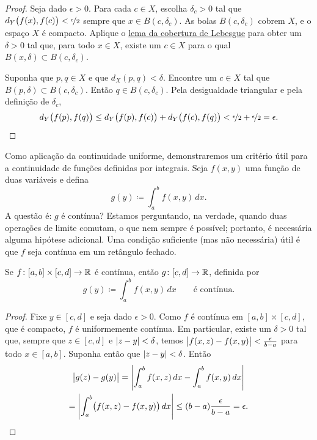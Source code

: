 \begin{proof}
Seja dado $\epsilon > 0$. Para cada $c \in X$, escolha $\delta_c > 0$ tal que
$d_Y\bigl(f(x),f(c)\bigr) < \nicefrac{\epsilon}{2}$
sempre que
$x \in B(c,\delta_c)$.
As bolas
$B(c,\delta_c)$ cobrem $X$, e o espaço $X$ é compacto.
Aplique o \hyperref[ms:lebesgue]{lema da cobertura de Lebesgue} para obter um
$\delta > 0$ tal que, para todo $x \in X$, existe um $c \in X$
para o qual $B(x,\delta) \subset B(c,\delta_c)$.

Suponha que $p, q \in X$ e que $d_X(p,q) < \delta$.
Encontre um $c \in X$ tal que $B(p,\delta) \subset B(c,\delta_c)$.
Então $q \in B(c,\delta_c)$. Pela desigualdade triangular
e pela definição de $\delta_c$,
\begin{equation*}
d_Y\bigl(f(p),f(q)\bigr)
\leq
d_Y\bigl(f(p),f(c)\bigr)
+
d_Y\bigl(f(c),f(q)\bigr)
<
\nicefrac{\epsilon}{2}+
\nicefrac{\epsilon}{2} = \epsilon .  \qedhere
\end{equation*}
\end{proof}

Como aplicação da continuidade uniforme,
demonstraremos um critério útil para a
continuidade de funções definidas por integrais.
Seja $f(x,y)$ uma função de duas variáveis e defina
\begin{equation*}
g(y) \coloneqq \int_a^b f(x,y) \,dx .
\end{equation*}
A questão é: $g$ é contínua?
Estamos perguntando, na verdade, quando duas operações de limite comutam,
o que nem sempre é possível; portanto, é necessária alguma hipótese
adicional. Uma condição suficiente (mas não
necessária) útil é que $f$ seja contínua em um retângulo fechado.

\begin{prop} \label{prop:integralcontcont}
Se $f \colon [a,b] \times [c,d] \to {\mathbb{R}}$ é contínua,
então $g \colon [c,d] \to {\mathbb{R}}$, definida por
\begin{equation*}
g(y) \coloneqq \int_a^b f(x,y) \,dx  \qquad \text{é contínua}.
\end{equation*}
\end{prop}

\begin{proof}
Fixe $y \in [c,d]$ e
seja dado $\epsilon > 0$.
Como $f$ é contínua em $[a,b] \times [c,d]$, que é compacto, $f$
é uniformemente contínua.
Em particular, existe um $\delta > 0$ tal que,
sempre que $z \in [c,d]$ e
$\lvert {z-y} \rvert < \delta$, temos
$\bigl\lvert {f(x,z)-f(x,y)} \bigr\rvert < \frac{\epsilon}{b-a}$ para todo $x \in [a,b]$.
Suponha então que $\lvert {z-y} \rvert < \delta$. Então
\begin{multline*}
\bigl\lvert {
g(z)-
g(y)
} \bigr\rvert
=
\left\lvert {
\int_a^b 
f(x,z) \,dx 
-
\int_a^b 
f(x,y) \,dx 
} \right\rvert
\\
=
\left\lvert {
\int_a^b 
\bigl(
f(x,z) - f(x,y)
\bigr)
\,dx 
} \right\rvert
\leq
(b-a)
\frac{\epsilon}{b-a}
= \epsilon . \qedhere
\end{multline*}
\end{proof}

